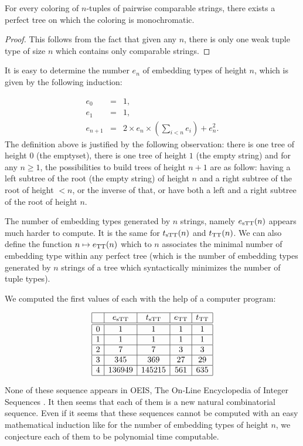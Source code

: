 \begin{theorem}
For every coloring of $n$-tuples of pairwise comparable strings, there exists a perfect tree on which the coloring is monochromatic.
\end{theorem}
\begin{proof}
This follows from the fact that given any $n$, there is only one weak tuple type of size $n$ which contains only comparable strings.
\end{proof}

It is easy to determine the number $e_n$ of embedding types of height $n$, which is given by the following induction:

$$
\begin{array}{rcl}
e_0&=&1,\\
e_1&=&1,\\
e_{n+1}&=&2 \times e_n \times (\sum_{i<n} e_i) + e_n^2.
\end{array}
$$
%
The definition above is justified by the following observation: there is one tree of height $0$ (the emptyset), there is one tree of height $1$ (the empty string) and for any $n \geq 1$, the possibilities to build trees of height $n+1$ are as follow: having a left subtree of the root (the empty string) of height $n$ and a right subtree of the root of height $<n$, or the inverse of that, or have both a left and a right subtree of the root of height $n$. 

The number of embedding types generated by $n$ strings, namely $e_{\mathrm{sTT}}(n)$ appears much harder to compute. It is the same for $t_{\mathrm{sTT}}(n)$ and $t_{\mathrm{TT}}(n)$. We can also define the function $n \mapsto e_{\mathrm{TT}}(n)$ which to $n$ associates the minimal number of embedding type within any perfect tree (which is the number of embedding types generated by $n$ strings of a tree which syntactically minimizes the number of tuple types).

We computed the first values of each with the help of a computer program:

$$
\begin{array}{|c|c|c|c|c|}
\hline
&e_{\mathrm{sTT}}&t_{\mathrm{sTT}}&e_{\mathrm{TT}}&t_{\mathrm{TT}}\\
\hline
\hline
0&1&1&1&1\\
\hline
1&1&1&1&1\\
\hline
2&7&7&3&3\\
\hline
3&345&369&27&29\\
\hline
4&136949&145215&561&635\\
\hline
\end{array}
$$

None of these sequence appears in OEIS, The On-Line Encyclopedia of Integer Sequences \cite{OEIS}. It then seems that each of them is a new natural combinatorial sequence. Even if it seems that these sequences cannot be computed with an easy mathematical induction like for the number of embedding types of height $n$, we conjecture each of them to be polynomial time computable.

